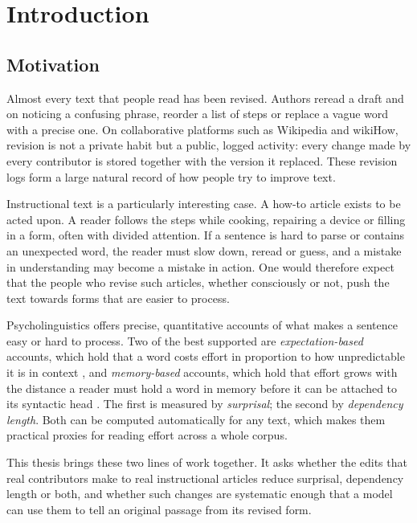 \documentclass[12pt,a4paper,oneside]{report}
\begin{document}
\cleardoublepage
\pagestyle{fancy}

\chapter{Introduction}
\label{ch:intro}

\section{Motivation}
Almost every text that people read has been revised. Authors reread a draft and on noticing a confusing phrase, reorder a list of steps or replace a vague word with a precise one. On collaborative platforms such as Wikipedia and wikiHow, revision is not a private habit but a public, logged activity: every change made by every contributor is stored together with the version it replaced. These revision logs form a large natural record of how people try to improve text.

Instructional text is a particularly interesting case. A how-to article exists to be acted upon. A reader follows the steps while cooking, repairing a device or filling in a form, often with divided attention. If a sentence is hard to parse or contains an unexpected word, the reader must slow down, reread or guess, and a mistake in understanding may become a mistake in action. One would therefore expect that the people who revise such articles, whether consciously or not, push the text towards forms that are easier to process.

Psycholinguistics offers precise, quantitative accounts of what makes a sentence easy or hard to process. Two of the best supported are \emph{expectation-based} accounts, which hold that a word costs effort in proportion to how unpredictable it is in context \citep{hale2001}, and \emph{memory-based} accounts, which hold that effort grows with the distance a reader must hold a word in memory before it can be attached to its syntactic head \citep{gibson1998}. The first is measured by \emph{surprisal}; the second by \emph{dependency length}. Both can be computed automatically for any text, which makes them practical proxies for reading effort across a whole corpus.

This thesis brings these two lines of work together. It asks whether the edits that real contributors make to real instructional articles reduce surprisal, dependency length or both, and whether such changes are systematic enough that a model can use them to tell an original passage from its revised form.
\end{document}
